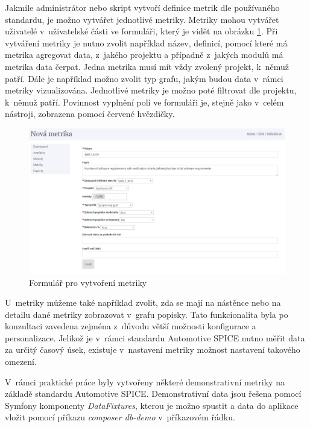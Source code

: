 \documentclass[czech,master]{diploma}
\begin{document}
Jakmile administrátor nebo skript vytvoří definice metrik dle používaného standardu, je možno vytvářet jednotlivé metriky. Metriky mohou vytvářet uživatelé v~uživatelské části ve formuláři, který je vidět na obrázku \ref{fig:new_metric_from}. Při vytváření metriky je nutno zvolit například název, definicí, pomocí které má metrika agregovat data, z~jakého projektu a případně z~jakých modulů má metrika data čerpat. Jedna metrika musí mít vždy zvolený projekt, k~němuž patří. Dále je například možno zvolit typ grafu, jakým budou data v~rámci metriky vizualizována. Jednotlivé metriky je možno poté filtrovat dle projektu, k~němuž patří. Povinnost vyplnění polí ve formuláři je, stejně jako v~celém nástroji, zobrazena pomocí červené hvězdičky.


\begin{figure}[!ht]
    \centering
    \includegraphics[width=1\textwidth]{Diplomka/Figures/new_metric_form.jpg}
    \caption{Formulář pro vytvoření metriky}
    \label{fig:new_metric_from}
\end{figure}

U~metriky můžeme také například zvolit, zda se mají na nástěnce nebo na detailu dané metriky zobrazovat v~grafu popisky. Tato funkcionalita byla po konzultaci zavedena zejména z~důvodu větší možnosti konfigurace a personalizace. Jelikož je v~rámci standardu Automotive SPICE nutno měřit data za určitý časový úsek, existuje v~nastavení metriky možnost nastavení takového omezení.

V~rámci praktické práce byly vytvořeny některé demonstrativní metriky na základě standardu Automotive SPICE. \cite{ref:metrics_and_dashboard_for_level_two} Demonstrativní data jsou řešena pomocí Symfony komponenty \textit{DataFixtures}, kterou je možno spustit a data do aplikace vložit pomocí příkazu \textit{composer db-demo} v~příkazovém řádku.
\end{document}
